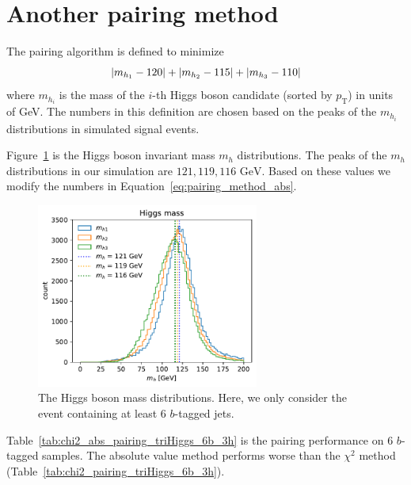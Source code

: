 \documentclass[12pt]{article}
\begin{document}
\section{Another pairing method}%
\label{sec:another_pairing_method}
	The pairing algorithm is defined to minimize
	\begin{equation}\label{eq:pairing_method_abs}
		\abs{m_{h_1} - 120} + \abs{m_{h_2} - 115} + \abs{m_{h_3} - 110}
	\end{equation}
	where $m_{h_i}$ is the mass of the $i$-th Higgs boson candidate (sorted by $p_{\text{T}}$) in units of GeV. The numbers in this definition are chosen based on the peaks of the $m_{h_i}$ distributions in simulated signal events.

	Figure~\ref{fig:mh_distribution_6b} is the Higgs boson invariant mass $m_h$ distributions. The peaks of the $m_{h}$ distributions in our simulation are $121, 119, 116 \text{ GeV}$. Based on these values we modify the numbers in Equation~\ref{eq:pairing_method_abs}.
	\begin{figure}[htpb] 
		\centering
        \includegraphics[width=0.65\textwidth]{mh_distribution_6b.pdf} 
		\caption{The Higgs boson mass distributions. Here, we only consider the event containing at least 6 $b$-tagged jets.}
		\label{fig:mh_distribution_6b}
	\end{figure}
	Table~\ref{tab:chi2_abs_pairing_triHiggs_6b_3h} is the pairing performance on 6 $b$-tagged samples. The absolute value method performs worse than the $\chi^2$ method (Table~\ref{tab:chi2_pairing_triHiggs_6b_3h}).
\end{document}

